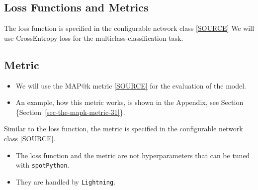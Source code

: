 \documentclass[
  letterpaper,
  DIV=11,
  numbers=noendperiod]{scrreprt}
\providecommand{\tightlist}{%
  \setlength{\itemsep}{0pt}\setlength{\parskip}{0pt}}\usepackage{longtable,booktabs,array}
\begin{document}
\hypertarget{sec-loss-functions-and-metrics-31}{%
\subsection{Loss Functions and
Metrics}\label{sec-loss-functions-and-metrics-31}}

The loss function is specified in the configurable network class
\href{https://github.com/sequential-parameter-optimization/spotPython/blob/main/src/spotPython/light/netlightbase.py}{{[}SOURCE{]}}
We will use CrossEntropy loss for the multiclass-classification task.

\hypertarget{sec-metric-31}{%
\subsection{Metric}\label{sec-metric-31}}

\begin{itemize}
\tightlist
\item
  We will use the MAP@k metric
  \href{https://github.com/sequential-parameter-optimization/spotPython/blob/main/src/spotPython/torch/mapk.py}{{[}SOURCE{]}}
  for the evaluation of the model.
\item
  An example, how this metric works, is shown in the Appendix, see
  Section \{Section~\ref{sec-the-mapk-metric-31}\}.
\end{itemize}

Similar to the loss function, the metric is specified in the
configurable network class
\href{https://github.com/sequential-parameter-optimization/spotPython/blob/main/src/spotPython/light/netlightbase.py}{{[}SOURCE{]}}.

\begin{tcolorbox}[enhanced jigsaw, titlerule=0mm, colbacktitle=quarto-callout-caution-color!10!white, coltitle=black, arc=.35mm, toptitle=1mm, colback=white, left=2mm, opacityback=0, bottomtitle=1mm, bottomrule=.15mm, breakable, opacitybacktitle=0.6, colframe=quarto-callout-caution-color-frame, rightrule=.15mm, toprule=.15mm, leftrule=.75mm, title=\textcolor{quarto-callout-caution-color}{\faFire}\hspace{0.5em}{Caution: Loss Function and Metric in Lightning}]

\begin{itemize}
\tightlist
\item
  The loss function and the metric are not hyperparameters that can be
  tuned with \texttt{spotPython}.
\item
  They are handled by \texttt{Lightning}.
\end{itemize}

\end{tcolorbox}
\end{document}
